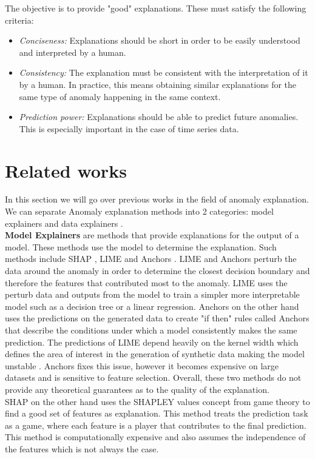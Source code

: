 \documentclass[oneside, a4paper, onecolumn, 11pt]{article}
\begin{document}
The objective is to provide "good" explanations. These must satisfy the following criteria: 
\begin{itemize}
  \item \textit{Conciseness:} Explanations should be short in order to be easily understood and interpreted by a human.
  \item \textit{Consistency:} The explanation must be consistent with the interpretation of it by a human. In practice, this means obtaining similar explanations for the same type of anomaly happening in the same context.
  \item \textit{Prediction power:} Explanations should be able to predict future anomalies. This is especially important in the case of time series data.
\end{itemize}
\section{Related works}
In this section we will go over previous works in the field of anomaly explanation. We can separate Anomaly explanation methods into 2 categories: model explainers and data explainers \cite{Li2023SurveyXAD} \cite{Panjei2022OutlierExplanations}.\\
\textbf{Model Explainers} are methods that provide explanations for the output of a model. These methods use the model to determine the explanation. Such methods include SHAP \cite{shap}, LIME \cite{lime} and Anchors \cite{anchors}. LIME and Anchors perturb the data around the anomaly in order to determine the closest decision boundary and therefore the features that contributed most to the anomaly. LIME uses the perturb data and outputs from the model to train a simpler more interpretable model such as a decision tree or a linear regression. Anchors on the other hand uses the predictions on the generated data to create "if then" rules called Anchors that describe the conditions under which a model consistently makes the same prediction. The predictions of LIME depend heavily on the kernel width which defines the area of interest in the generation of synthetic data making the model unstable \cite{optilime}. Anchors fixes this issue, however it becomes expensive on large datasets and is sensitive to feature selection. Overall, these two methods do not provide any theoretical guarantees as to the quality of the explanation.\\ SHAP on the other hand uses the SHAPLEY values concept from game theory to find a good set of features as explanation. This method treats the prediction task as a game, where each feature is a player that contributes to the final prediction. This method is computationally expensive and also assumes the independence of the features which is not always the case.\\
\end{document}
